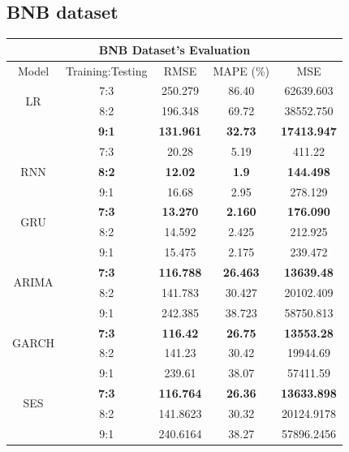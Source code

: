 \documentclass{ieeeojies}
\begin{document}
\subsection{BNB dataset}
\vspace{-2mm}
\begin{table}[H]
  \centering
  \begin{tabular}{|c|c|c|c|c|}
    \hline
    \multicolumn{5}{|c|}{\textbf{BNB Dataset's Evaluation}}                                             \\
    \hline
    \centering Model       & Training:Testing & RMSE             & MAPE (\%)       & MSE                \\
    \hline
    \multirow{2}{*}{LR}    & 7:3              & 250.279          & 86.40           & 62639.603          \\ & 8:2 &  196.348 & 69.72 & 38552.750 \\ & \textbf{9:1}&\textbf{131.961}&\textbf{32.73}&\textbf{17413.947}\\
    \hline
    \multirow{3}{*}{RNN}   & 7:3              & 20.28            & 5.19            & 411.22             \\
                           & \textbf{8:2}     & \textbf{12.02}   & \textbf{1.9}    & \textbf{144.498}   \\
                           & 9:1              & 16.68            & 2.95            & 278.129            \\
    \hline
    \multirow{2}{*}{GRU}   & \textbf{7:3}     & \textbf{13.270}  & \textbf{2.160}  & \textbf{176.090}   \\ &  8:2& 14.592 &2.425&	212.925 \\ & 9:1 & 15.475 & 2.175 & 239.472\\
    \hline
    \multirow{2}{*}{ARIMA} & \textbf{7:3}     & \textbf{116.788} & \textbf{26.463} & \textbf{13639.48}  \\ & 8:2 & 141.783 & 30.427 & 20102.409 \\ & 9:1 & 242.385 & 38.723 & 58750.813\\
    \hline
    \multirow{2}{*}{GARCH} & \textbf{7:3}     & \textbf{116.42}  & \textbf{26.75}  & \textbf{13553.28}  \\
                           & 8:2              & 141.23           & 30.42           & 19944.69           \\
                           & 9:1              & 239.61           & 38.07           & 57411.59           \\
    \hline
    \multirow{2}{*}{SES}   & \textbf{7:3}     & \textbf{116.764} & \textbf{26.36}  & \textbf{13633.898} \\ & 8:2 & 141.8623 & 30.32 & 20124.9178 \\ & 9:1 &  240.6164 &	38.27 & 57896.2456 \\

\end{tabular}
\end{table}
\end{document}
